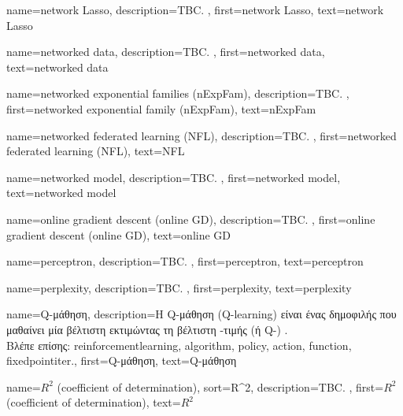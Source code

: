 {name={network Lasso},
	description={TBC. },
	first={network Lasso},
	text={network Lasso}
}

{name={networked data},
	description={TBC. }, 
	first={networked data},
	text={networked data}  
}

{name={networked exponential families (nExpFam)}, 
	description={TBC. },
	  first={networked exponential family (nExpFam)},
	  text={nExpFam}  
}

{name={networked federated learning (NFL)},
	description={TBC. },
 	first={networked federated learning (NFL)},
	text={NFL} 
}

{name={networked model},
	description={TBC. }, 
   	first={networked model},
   	text={networked model}  
}

{name={online gradient descent (online GD)}, 
	description={TBC. },
	first={online gradient descent (online GD)},
	text={online GD} 
}

{name={perceptron}, 
	description={TBC. },
	first={perceptron},
	text={perceptron}
}

{name={perplexity},
	description={TBC. },
 	first={perplexity},
 	text={perplexity}
}

{name={Q-\foreignlanguage{greek}{μάθηση}}, 
	description={\foreignlanguage{greek}{Η} Q-\foreignlanguage{greek}{μάθηση} (Q-learning) 
		\foreignlanguage{greek}{είναι ένας δημοφιλής}   
		\foreignlanguage{greek}{που μαθαίνει μία βέλτιστη}  \foreignlanguage{greek}{εκτιμώντας τη βέλτιστη} 
		 -\foreignlanguage{greek}{τιμής (ή} Q-) \cite{SuttonEd2}.  
		\\
		\foreignlanguage{greek}{Βλέπε επίσης:} \gls{reinforcementlearning}, \gls{algorithm}, \gls{policy}, \gls{action}, \gls{function}, \gls{fixedpointiter}.},
	first={Q-\foreignlanguage{greek}{μάθηση}},
	text={Q-\foreignlanguage{greek}{μάθηση}} 
}

{name={$R^2$ (coefficient of determination)}, 
sort={R^2},
	description={TBC. }, 
	first={$R^2$ (coefficient of determination)}, 
	text={$R^2$}
}

